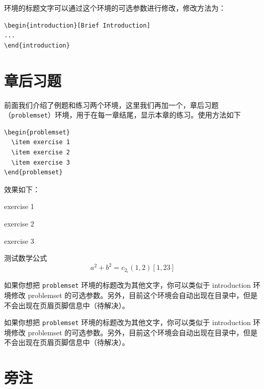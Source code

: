 \documentclass[lang=cn,10pt,scheme=chinese]{boyogalaelegantbook}
\begin{document}
环境的标题文字可以通过这个环境的可选参数进行修改，修改方法为：
\begin{lstlisting}
\begin{introduction}[Brief Introduction]
...
\end{introduction}
\end{lstlisting}

\section{章后习题}
前面我们介绍了例题和练习两个环境，这里我们再加一个，章后习题（\lstinline{problemset}）环境，用于在每一章结尾，显示本章的练习。使用方法如下

\begin{lstlisting}
\begin{problemset}
  \item exercise 1
  \item exercise 2
  \item exercise 3
\end{problemset}
\end{lstlisting}


效果如下：
\begin{problemset}[我的题目]
  \item exercise 1
  \item exercise 2
  \item exercise 3
  \item 测试数学公式
  \begin{equation}
    a^2+b^2=c_{2_{i}} (1,2) [1,23]
  \end{equation}
\end{problemset}

\begin{remark}
如果你想把 \lstinline{problemset} 环境的标题改为其他文字，你可以类似于 introduction 环境修改 problemset 的可选参数。另外，目前这个环境会自动出现在目录中，但是不会出现在页眉页脚信息中（待解决）。
\end{remark}

\begin{solution}
如果你想把 \lstinline{problemset} 环境的标题改为其他文字，你可以类似于 introduction 环境修改 problemset 的可选参数。另外，目前这个环境会自动出现在目录中，但是不会出现在页眉页脚信息中（待解决）。
\end{solution}

\section{旁注}
\end{document}
